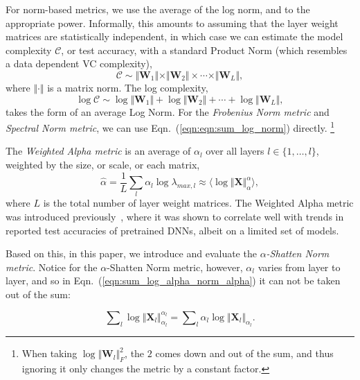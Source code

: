 For norm-based metrics, we use the average of the log norm, and to the appropriate power.
Informally, this amounts to assuming that the layer weight matrices are statistically independent, in which case we can estimate the model complexity $\mathcal{C}$, or test accuracy, with a standard Product Norm (which resembles a data dependent VC complexity),
\begin{equation}
\mathcal{C}\sim\Vert\mathbf{W}_{1}\Vert\times\Vert\mathbf{W}_{2}\Vert \times \cdots \times \Vert\mathbf{W}_{L}\Vert ,
\end{equation}
where $\Vert\cdot\Vert$ is a matrix norm.   
The log complexity,
\begin{equation}
\label{eqn:eqn:sum_log_norm}
\log\mathcal{C} \sim \log\Vert\mathbf{W}_{1}\Vert+\log\Vert\mathbf{W}_{2}\Vert + \cdots + \log\Vert\mathbf{W}_{L}\Vert  ,
\end{equation}
 takes the form of an average Log Norm.
For the \emph{Frobenius Norm metric} and \emph{Spectral Norm metric}, we can use Eqn.~(\ref{eqn:eqn:sum_log_norm}) directly.%
\footnote{When taking $\log\Vert\mathbf{W}_{l}\Vert_{F}^{2}$, the $2$ comes down and out of the sum, and thus ignoring it only changes the metric by a constant factor.}


The \emph{Weighted Alpha metric} is an average of $\alpha_l$ over all layers $l \in \{1,\ldots,l\}$, weighted by the size, or scale, or each matrix,
\begin{equation}
\hat{\alpha} = \dfrac{1}{L}\sum_l \alpha_l\log\lambda_{max,l}\approx\langle\log\Vert\mathbf{X}\Vert_{\alpha}^{\alpha}\rangle    ,
\end{equation}
where $L$ is the total number of layer weight matrices.
The Weighted Alpha metric was introduced previously~\cite{MM20_SDM}, where it was shown to correlate well with trends in reported test accuracies of pretrained DNNs, albeit on a limited set of models.

Based on this, in this paper, we introduce and evaluate the \emph{$\alpha$-Shatten Norm metric}.
Notice for the $\alpha$-Shatten Norm metric, however, $\alpha_l$ varies from layer to layer, and so in Eqn.~(\ref{eqn:sum_log_alpha_norm_alpha}) it can not be taken out of the sum:

\begin{equation}
\label{eqn:sum_log_alpha_norm_alpha}
\sum\nolimits_l \log \Vert\mathbf{X}_l\Vert_{\alpha_l}^{\alpha_l} 
=
\sum\nolimits_l \alpha_l \log \Vert\mathbf{X}_l\Vert_{\alpha_l} .
\end{equation}

